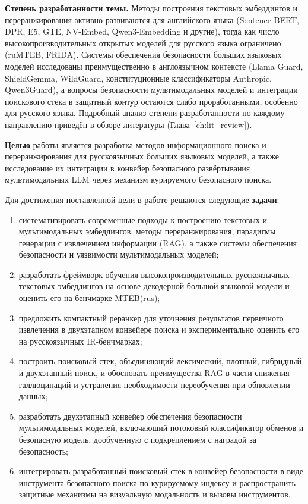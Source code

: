 \textbf{Степень разработанности темы.} Методы построения текстовых эмбеддингов и переранжирования активно развиваются для английского языка (Sentence-BERT, DPR, E5, GTE, NV-Embed, Qwen3-Embedding и другие), тогда как число высокопроизводительных открытых моделей для русского языка ограничено (ruMTEB, FRIDA). Системы обеспечения безопасности больших языковых моделей исследованы преимущественно в англоязычном контексте (Llama Guard, ShieldGemma, WildGuard, конституционные классификаторы Anthropic, Qwen3Guard), а вопросы безопасности мультимодальных моделей и интеграции поискового стека в защитный контур остаются слабо проработанными, особенно для русского языка. Подробный анализ степени разработанности по каждому направлению приведён в обзоре литературы (Глава~\ref{ch:lit_review}).

\textbf{Целью} работы является разработка методов информационного поиска и переранжирования для русскоязычных больших языковых моделей, а также исследование их интеграции в конвейер безопасного развёртывания мультимодальных LLM через механизм курируемого безопасного поиска.

Для достижения поставленной цели в работе решаются следующие \textbf{задачи}:
\begin{enumerate}
    \item систематизировать современные подходы к построению текстовых и мультимодальных эмбеддингов, методы переранжирования, парадигмы генерации с извлечением информации (RAG), а также системы обеспечения безопасности и уязвимости мультимодальных моделей;
    \item разработать фреймворк обучения высокопроизводительных русскоязычных текстовых эмбеддингов на основе декодерной большой языковой модели и оценить его на бенчмарке MTEB(rus);
    \item предложить компактный реранкер для уточнения результатов первичного извлечения в двухэтапном конвейере поиска и экспериментально оценить его на русскоязычных IR-бенчмарках;
    \item построить поисковый стек, объединяющий лексический, плотный, гибридный и двухэтапный поиск, и обосновать преимущества RAG в части снижения галлюцинаций и устранения необходимости переобучения при обновлении данных;
    \item разработать двухэтапный конвейер обеспечения безопасности мультимодальных моделей, включающий потоковый классификатор обменов и безопасную модель, дообученную с подкреплением с наградой за безопасность;
    \item интегрировать разработанный поисковый стек в конвейер безопасности в виде инструмента безопасного поиска по курируемому индексу и распространить защитные механизмы на визуальную модальность и вызовы инструментов.
\end{enumerate}

